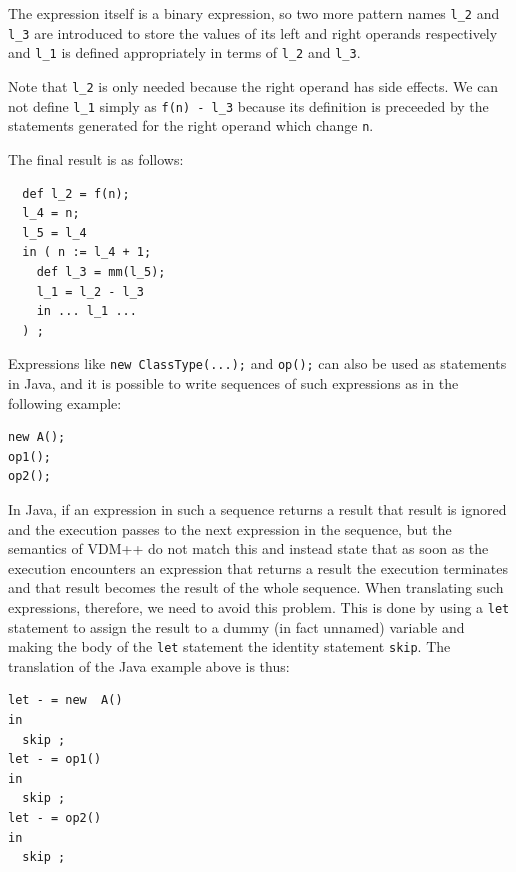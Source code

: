\documentclass[\pformat,12pt]{article}
\begin{document}
The expression itself is a binary expression, so two more pattern
names \texttt{l\_2} and \texttt{l\_3} are introduced to store the
values of its left and right operands respectively and \texttt{l\_1}
is defined appropriately in terms of \texttt{l\_2} and \texttt{l\_3}. 

Note that \texttt{l\_2} is only needed because
the right operand has side effects. We can not define \texttt{l\_1}
simply as \texttt{f(n) - l\_3} because its definition is preceeded
by the statements generated for the right operand which change \texttt{n}.

The final result is as follows:

\begin{small}
\begin{verbatim}
  def l_2 = f(n);
  l_4 = n;
  l_5 = l_4
  in ( n := l_4 + 1;
    def l_3 = mm(l_5);
    l_1 = l_2 - l_3
    in ... l_1 ...
  ) ;

\end{verbatim}
\end{small}


Expressions like \texttt{new ClassType(...);} and \texttt{op();} can
also be used as statements in Java, and it is possible to write
sequences of such expressions as in the following example:

\begin{small}
\begin{verbatim}
new A();
op1();
op2();
\end{verbatim}
\end{small}

In Java, if an expression in such a sequence returns a result that
result is ignored and the execution passes to the next expression in
the sequence, but the semantics of VDM++ do not match this and instead
state that as soon as the execution encounters an expression that
returns a result the execution terminates and that result becomes the
result of the whole sequence. When translating such expressions,
therefore, we need to avoid this problem. This is done by using a
\texttt{let} statement to assign the result to a dummy (in fact
unnamed) variable and making the body of the \texttt{let} statement
the identity statement \texttt{skip}. The translation of the Java
example above is thus:

\begin{small}
\begin{verbatim}
let - = new  A()
in 
  skip ;
let - = op1()
in 
  skip ;
let - = op2()
in 
  skip ;
\end{verbatim}
\end{small}
\end{document}
